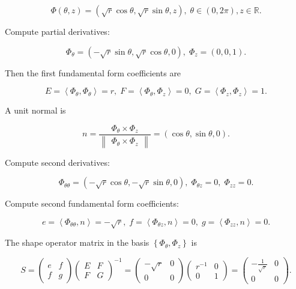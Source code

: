 \documentclass[10pt]{article}
\begin{document}
\[
\Phi \left( {\theta ,z}\right)  = \left( {\sqrt{r}\cos \theta ,\sqrt{r}\sin \theta ,z}\right) ,\;\theta  \in  \left( {0,{2\pi }}\right) ,z \in  \mathbb{R}.
\]

Compute partial derivatives:

\[
{\Phi }_{\theta } = \left( {-\sqrt{r}\sin \theta ,\sqrt{r}\cos \theta ,0}\right) ,\;{\Phi }_{z} = \left( {0,0,1}\right) .
\]

Then the first fundamental form coefficients are

\[
E = \left\langle  {{\Phi }_{\theta },{\Phi }_{\theta }}\right\rangle   = r,\;F = \left\langle  {{\Phi }_{\theta },{\Phi }_{z}}\right\rangle   = 0,\;G = \left\langle  {{\Phi }_{z},{\Phi }_{z}}\right\rangle   = 1.
\]

A unit normal is

\[
n = \frac{{\Phi }_{\theta } \times  {\Phi }_{z}}{\begin{Vmatrix}{\Phi }_{\theta } \times  {\Phi }_{z}\end{Vmatrix}} = \left( {\cos \theta ,\sin \theta ,0}\right) .
\]

Compute second derivatives:

\[
{\Phi }_{\theta \theta } = \left( {-\sqrt{r}\cos \theta , - \sqrt{r}\sin \theta ,0}\right) ,\;{\Phi }_{\theta z} = 0,\;{\Phi }_{zz} = 0.
\]

Compute second fundamental form coefficients:

\[
e = \left\langle  {{\Phi }_{\theta \theta },n}\right\rangle   =  - \sqrt{r},\;f = \left\langle  {{\Phi }_{\theta z},n}\right\rangle   = 0,\;g = \left\langle  {{\Phi }_{zz},n}\right\rangle   = 0.
\]

The shape operator matrix in the basis \(\left\{  {{\Phi }_{\theta },{\Phi }_{z}}\right\}\) is

\[
S = \left( \begin{array}{ll} e & f \\  f & g \end{array}\right) {\left( \begin{array}{ll} E & F \\  F & G \end{array}\right) }^{-1} = \left( \begin{matrix}  - \sqrt{r} & 0 \\  0 & 0 \end{matrix}\right) \left( \begin{matrix} {r}^{-1} & 0 \\  0 & 1 \end{matrix}\right)  = \left( \begin{matrix}  - \frac{1}{\sqrt{r}} & 0 \\  0 & 0 \end{matrix}\right) .
\]
\end{document}
